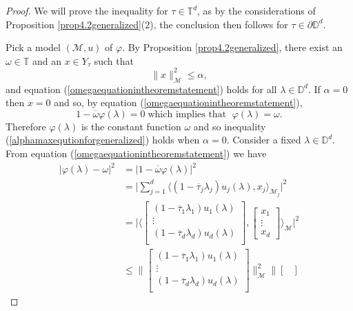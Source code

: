 \documentclass[11pt, reqno]{amsart}
\newcommand\1{\boldsymbol {1}}
\numberwithin{equation}{section}
\begin{document}
\begin{proof}
We will prove the inequality for $\tau\in\mathbb{T}^{d}$, as by the considerations of Proposition \ref{prop4.2generalized}(2), the conclusion then follows for $\tau\in\partial\mathbb{D}^{d}$.

Pick a model $(\mathcal{M},u)$ of $\varphi$. By Proposition \ref{prop4.2generalized}, there exist an $\omega\in\mathbb{T}$ and an $x\in Y_{\tau}$ such that 
\begin{equation}\label{normxlessalpha}
\|x\|^{2}_{\mathcal{M}}\leq \alpha,
\end{equation}
and equation (\ref{omegaequationintheoremstatement}) holds for all $\lambda\in\mathbb{D}^{d}$. If $\alpha=0$ then $x=0$ and so, by equation (\ref{omegaequationintheoremstatement}), 
$$1-\overline{\omega}\varphi(\lambda)=0 \; \text{which implies that } \; \varphi(\lambda)=\omega.$$
Therefore $\varphi(\lambda)$ is the constant function $\omega$ and so inequality (\ref{alphamaxequtionforgeneralized}) holds when $\alpha=0$.
Consider a fixed $\lambda\in\mathbb{D}^{d}$. From equation (\ref{omegaequationintheoremstatement})
 we have 
\begin{align*}
\lvert \varphi(\lambda)-\omega\rvert^{2}&=\lvert 1-\overline{\omega}\varphi(\lambda)\rvert^{2}\\
&= \Bigg\lvert \sum_{j=1}^{d} \big\langle (1-\overline{\tau}_{j}\lambda_{j})u_{j}(\lambda),x_{j}\big\rangle_{\mathcal{M}_{j}}\Bigg\rvert^{2} \\
&=\Bigg\lvert \Bigg\langle\begin{bmatrix}
	(1-\overline{\tau}_{1}\lambda_{1})u_{1}(\lambda) \\
    \vdots \\
    (1-\overline{\tau}_{d}\lambda_{d})u_{d}(\lambda) \\
\end{bmatrix},\begin{bmatrix}
x_{1}\\
\vdots\\
x_{d}
\end{bmatrix}\Bigg\rangle_{\mathcal{M}}\Bigg\rvert^{2}\\
&\leq\Bigg\|\begin{bmatrix}
	(1-\overline{\tau}_{1}\lambda_{1})u_{1}(\lambda) \\
    \vdots \\
    (1-\overline{\tau}_{d}\lambda_{d})u_{d}(\lambda) \\
\end{bmatrix}\Bigg\|^{2}_{\mathcal{M}}\Bigg\|\begin{bmatrix}

\end{bmatrix}
\end{align*}
\end{proof}
\end{document}

